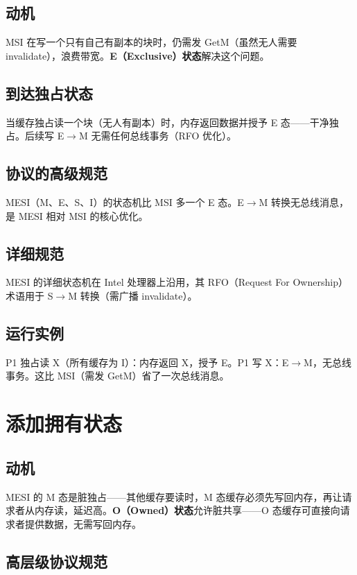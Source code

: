 \subsection{动机}

MSI 在写一个只有自己有副本的块时，仍需发 GetM（虽然无人需要 invalidate），浪费带宽。\textbf{E（Exclusive）状态}解决这个问题。

\subsection{到达独占状态}

当缓存独占读一个块（无人有副本）时，内存返回数据并授予 E 态——干净独占。后续写 E$\rightarrow$M 无需任何总线事务（RFO 优化）。

\subsection{协议的高级规范}

MESI（M、E、S、I）的状态机比 MSI 多一个 E 态。E$\rightarrow$M 转换无总线消息，是 MESI 相对 MSI 的核心优化。

\subsection{详细规范}

MESI 的详细状态机在 Intel 处理器上沿用，其 RFO（Request For Ownership）术语用于 S$\rightarrow$M 转换（需广播 invalidate）。

\subsection{运行实例}

P1 独占读 X（所有缓存为 I）：内存返回 X，授予 E。P1 写 X：E$\rightarrow$M，无总线事务。这比 MSI（需发 GetM）省了一次总线消息。

\section{添加拥有状态}

\subsection{动机}

MESI 的 M 态是脏独占——其他缓存要读时，M 态缓存必须先写回内存，再让请求者从内存读，延迟高。\textbf{O（Owned）状态}允许脏共享——O 态缓存可直接向请求者提供数据，无需写回内存。

\subsection{高层级协议规范}

